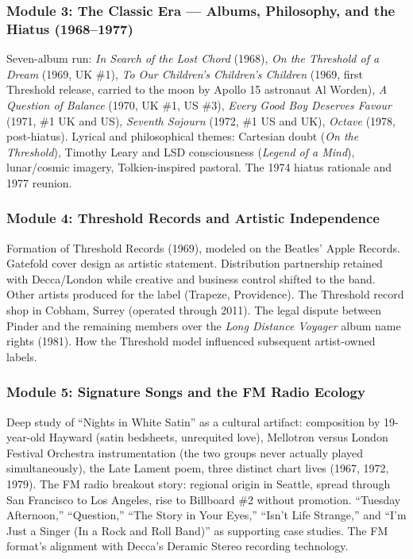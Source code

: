 \documentclass[11pt,letterpaper]{article}
\begin{document}
\subsubsection{Module 3: The Classic Era --- Albums, Philosophy, and the Hiatus (1968--1977)}

Seven-album run: \textit{In Search of the Lost Chord} (1968), \textit{On the Threshold of a Dream} (1969, UK \#1), \textit{To Our Children's Children's Children} (1969, first Threshold release, carried to the moon by Apollo 15 astronaut Al Worden), \textit{A Question of Balance} (1970, UK \#1, US \#3), \textit{Every Good Boy Deserves Favour} (1971, \#1 UK and US), \textit{Seventh Sojourn} (1972, \#1 US and UK), \textit{Octave} (1978, post-hiatus). Lyrical and philosophical themes: Cartesian doubt (\textit{On the Threshold}), Timothy Leary and LSD consciousness (\textit{Legend of a Mind}), lunar/cosmic imagery, Tolkien-inspired pastoral. The 1974 hiatus rationale and 1977 reunion.

\subsubsection{Module 4: Threshold Records and Artistic Independence}

Formation of Threshold Records (1969), modeled on the Beatles' Apple Records. Gatefold cover design as artistic statement. Distribution partnership retained with Decca/London while creative and business control shifted to the band. Other artists produced for the label (Trapeze, Providence). The Threshold record shop in Cobham, Surrey (operated through 2011). The legal dispute between Pinder and the remaining members over the \textit{Long Distance Voyager} album name rights (1981). How the Threshold model influenced subsequent artist-owned labels.

\subsubsection{Module 5: Signature Songs and the FM Radio Ecology}

Deep study of ``Nights in White Satin'' as a cultural artifact: composition by 19-year-old Hayward (satin bedsheets, unrequited love), Mellotron versus London Festival Orchestra instrumentation (the two groups never actually played simultaneously), the Late Lament poem, three distinct chart lives (1967, 1972, 1979). The FM radio breakout story: regional origin in Seattle, spread through San Francisco to Los Angeles, rise to Billboard \#2 without promotion. ``Tuesday Afternoon,'' ``Question,'' ``The Story in Your Eyes,'' ``Isn't Life Strange,'' and ``I'm Just a Singer (In a Rock and Roll Band)'' as supporting case studies. The FM format's alignment with Decca's Deramic Stereo recording technology.
\end{document}
